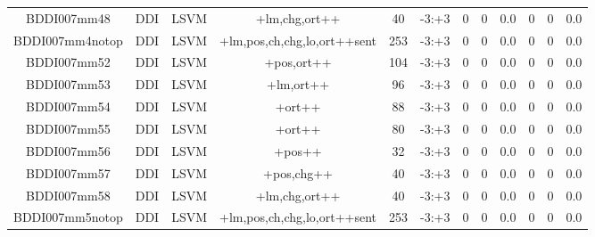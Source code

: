 \documentclass[a4paper]{article}
\begin{document}
\begin{landscape}
\begin{center}
\begin{tabular}{ |c|c|c|c|c|c|c|c|c|c|c|c|}
 
 	
 	\small{ BDDI007mm48 } & \small{ DDI} & \small{  LSVM }  & +lm,chg,ort++  &  40 &  \small{  -3:+3 }  &  0 & 0 & 0.0  &  0 & 0 & 0.0 \\
 	

 
 	
 	\small{ BDDI007mm4notop } & \small{ DDI} & \small{  LSVM }  & +lm,pos,ch,chg,lo,ort++sent  &  253 &  \small{  -3:+3 }  &  0 & 0 & 0.0  &  0 & 0 & 0.0 \\
 	

 
 	
 	\small{ BDDI007mm52 } & \small{ DDI} & \small{  LSVM }  & +pos,ort++  &  104 &  \small{  -3:+3 }  &  0 & 0 & 0.0  &  0 & 0 & 0.0 \\
 	

 
 	
 	\small{ BDDI007mm53 } & \small{ DDI} & \small{  LSVM }  & +lm,ort++  &  96 &  \small{  -3:+3 }  &  0 & 0 & 0.0  &  0 & 0 & 0.0 \\
 	

 
 	
 	\small{ BDDI007mm54 } & \small{ DDI} & \small{  LSVM }  & +ort++  &  88 &  \small{  -3:+3 }  &  0 & 0 & 0.0  &  0 & 0 & 0.0 \\
 	

 
 	
 	\small{ BDDI007mm55 } & \small{ DDI} & \small{  LSVM }  & +ort++  &  80 &  \small{  -3:+3 }  &  0 & 0 & 0.0  &  0 & 0 & 0.0 \\
 	

 
 	
 	\small{ BDDI007mm56 } & \small{ DDI} & \small{  LSVM }  & +pos++  &  32 &  \small{  -3:+3 }  &  0 & 0 & 0.0  &  0 & 0 & 0.0 \\
 	

 
 	
 	\small{ BDDI007mm57 } & \small{ DDI} & \small{  LSVM }  & +pos,chg++  &  40 &  \small{  -3:+3 }  &  0 & 0 & 0.0  &  0 & 0 & 0.0 \\
 	

 
 	
 	\small{ BDDI007mm58 } & \small{ DDI} & \small{  LSVM }  & +lm,chg,ort++  &  40 &  \small{  -3:+3 }  &  0 & 0 & 0.0  &  0 & 0 & 0.0 \\
 	

 
 	
 	\small{ BDDI007mm5notop } & \small{ DDI} & \small{  LSVM }  & +lm,pos,ch,chg,lo,ort++sent  &  253 &  \small{  -3:+3 }  &  0 & 0 & 0.0  &  0 & 0 & 0.0 \\
 	


\end{tabular}
\end{center}
\end{landscape}
\end{document}
